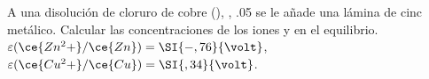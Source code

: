 A una disolución de cloruro de cobre (), , \SI{,05}{\Molar} se le añade una lámina de cinc metálico. Calcular las concentraciones de los iones  y  en el equilibrio. $\varepsilon(\ce{Zn^2+}/\ce{Zn})=\SI{-,76}{\volt}$, $\varepsilon(\ce{Cu^2+}/\ce{Cu}) = \SI{,34}{\volt}$.
